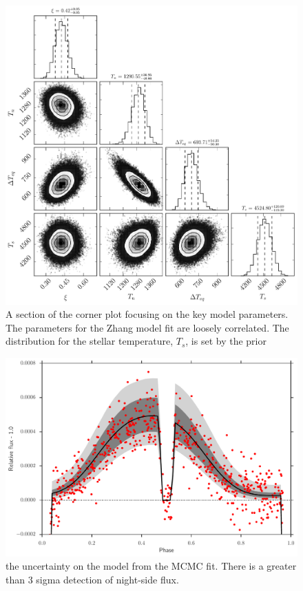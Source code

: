 \documentclass[a4paper,fleqn,usenatbib]{mnras}
\begin{document}
\begin{figure}
\begin{center}
\includegraphics[width=\columnwidth]{img/free_parameterstriangle.pdf}
\caption{A section of the corner plot focusing on the key model parameters. The parameters for the Zhang model fit are loosely correlated. The distribution for the stellar temperature, $T_s$, is set by the prior}
\label{fig:triangle corner sub}
\end{center}
\end{figure}

\begin{figure}
\begin{center}
\includegraphics[width=\columnwidth]{img/model.pdf}
\caption{the uncertainty on the model from the MCMC fit. There is a greater than 3 sigma detection of night-side flux.}
\label{fig:model}
\end{center}
\end{figure}
\end{document}
